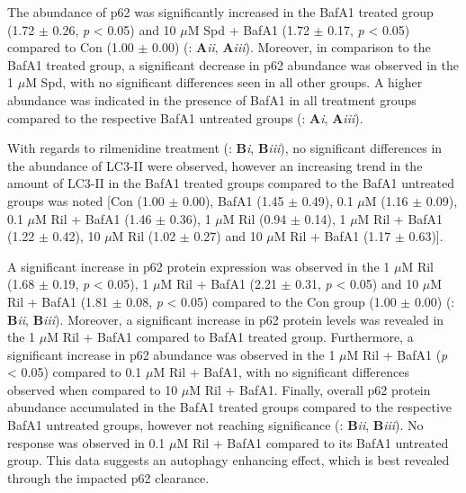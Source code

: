 {The abundance of p62 was significantly increased in the BafA1 treated group (1.72 $\pm$ 0.26, \textit{p} < 0.05) and  10 $\mu$M Spd + BafA1 (1.72 $\pm$ 0.17, \textit{p} < 0.05) compared to Con (1.00 $\pm$ 0.00) (: \textbf{A}\textit{ii}, \textbf{A}\textit{iii}). Moreover, in comparison to the BafA1 treated group, a significant decrease in p62 abundance was observed in the 1 $\mu$M Spd, with no significant differences seen in all other groups. A higher abundance was indicated in the presence of BafA1 in all treatment groups compared to the respective BafA1 untreated groups (: \textbf{A}\textit{i}, \textbf{A}\textit{iii}).

With regards to rilmenidine treatment (: \textbf{B}\textit{i}, \textbf{B}\textit{iii}), no significant differences in the abundance of LC3-II were observed, however an increasing trend in the amount of LC3-II in the BafA1 treated groups compared to the BafA1 untreated groups was noted [Con (1.00 $\pm$ 0.00), BafA1 (1.45 $\pm$ 0.49), 0.1 $\mu$M (1.16 $\pm$ 0.09), 0.1 $\mu$M Ril + BafA1 (1.46 $\pm$ 0.36), 1 $\mu$M Ril (0.94 $\pm$ 0.14), 1 $\mu$M Ril + BafA1 (1.22 $\pm$ 0.42), 10 $\mu$M Ril (1.02 $\pm$ 0.27) and 10 $\mu$M Ril + BafA1 (1.17 $\pm$ 0.63)].

A significant increase in p62 protein expression was observed in the 1 $\mu$M Ril (1.68 $\pm$ 0.19, \textit{p} < 0.05), 1 $\mu$M Ril + BafA1 (2.21 $\pm$ 0.31, \textit{p} < 0.05) and 10 $\mu$M Ril + BafA1 (1.81 $\pm$ 0.08, \textit{p} < 0.05) compared to the Con group (1.00 $\pm$ 0.00) (: \textbf{B}\textit{ii}, \textbf{B}\textit{iii}). Moreover, a significant increase in p62 protein levels was revealed in the 1 $\mu$M Ril + BafA1 compared to BafA1 treated group. Furthermore, a significant increase in p62 abundance was observed in the 1 $\mu$M Ril + BafA1 (\textit{p} < 0.05) compared to 0.1 $\mu$M Ril + BafA1, with no significant differences observed when compared to 10 $\mu$M Ril + BafA1. Finally, overall p62 protein abundance accumulated in the BafA1 treated groups compared to the respective BafA1 untreated groups, however not reaching significance (: \textbf{B}\textit{ii}, \textbf{B}\textit{iii}). No response was observed in 0.1 $\mu$M Ril + BafA1 compared to its BafA1 untreated group. This data suggests an autophagy enhancing effect, which is best revealed through the impacted p62 clearance.

}
